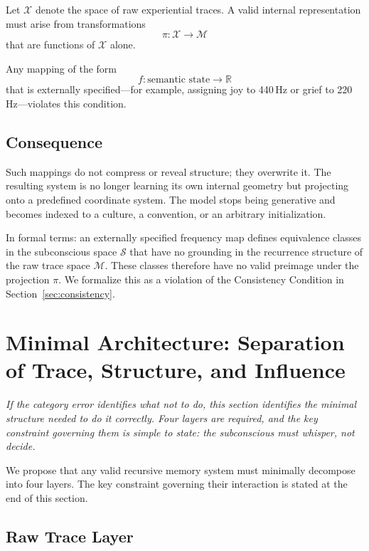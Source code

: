 \documentclass[12pt,a4paper]{article}
\begin{document}
Let $\mathcal{X}$ denote the space of raw experiential traces. A valid internal representation must arise from transformations
\[
\pi : \mathcal{X} \rightarrow \mathcal{M}
\]
that are functions of $\mathcal{X}$ alone.

Any mapping of the form
\[
f : \text{semantic state} \rightarrow \mathbb{R}
\]
that is externally specified---for example, assigning joy to 440\,Hz or grief to 220\,Hz---violates this condition.

\subsection{Consequence}

Such mappings do not compress or reveal structure; they overwrite it. The resulting system is no longer learning its own internal geometry but projecting onto a predefined coordinate system. The model stops being generative and becomes indexed to a culture, a convention, or an arbitrary initialization.

In formal terms: an externally specified frequency map defines equivalence classes in the subconscious space $\mathcal{S}$ that have no grounding in the recurrence structure of the raw trace space $\mathcal{M}$. These classes therefore have no valid preimage under the projection $\pi$. We formalize this as a violation of the Consistency Condition in Section~\ref{sec:consistency}.

\section{Minimal Architecture: Separation of Trace, Structure, and Influence}
\label{sec:architecture}

\textit{If the category error identifies what not to do, this section identifies the minimal structure needed to do it correctly. Four layers are required, and the key constraint governing them is simple to state: the subconscious must whisper, not decide.}

We propose that any valid recursive memory system must minimally decompose into four layers. The key constraint governing their interaction is stated at the end of this section.

\subsection{Raw Trace Layer}
\end{document}
